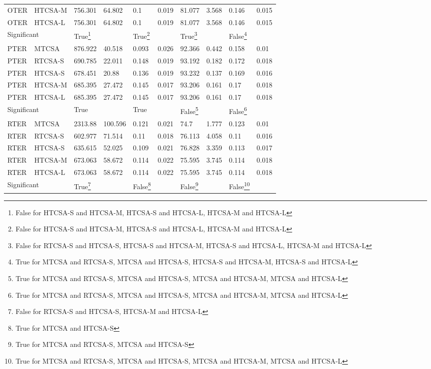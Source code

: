 \begin{table}[H]
\begin{minipage}{\textwidth}
\begin{tabular}{llllllllll}
			OTER & HTCSA-M & 756.301 & 64.802 & 0.1 & 0.019 & 81.077 & 3.568 & 0.146 & 0.015 \\ 
			OTER & HTCSA-L & 756.301 & 64.802 & 0.1 & 0.019 & 81.077 & 3.568 & 0.146 & 0.015 \\ 
			\multicolumn{2}{l}{Significant} & True\footnote{False for HTCSA-S and HTCSA-M, HTCSA-S and HTCSA-L, HTCSA-M and HTCSA-L} &  & True\footnote{False for HTCSA-S and HTCSA-M, HTCSA-S and HTCSA-L, HTCSA-M and HTCSA-L} &  & True\footnote{False for RTCSA-S and HTCSA-S, HTCSA-S and HTCSA-M, HTCSA-S and HTCSA-L, HTCSA-M and HTCSA-L} &  & False\footnote{True for MTCSA and RTCSA-S, MTCSA and HTCSA-S, HTCSA-S and HTCSA-M, HTCSA-S and HTCSA-L} &  \\ 
			\midrule
			PTER & MTCSA & 876.922 & 40.518 & 0.093 & 0.026 & 92.366 & 0.442 & 0.158 & 0.01 \\ 
			PTER & RTCSA-S & 690.785 & 22.011 & 0.148 & 0.019 & 93.192 & 0.182 & 0.172 & 0.018 \\ 
			PTER & HTCSA-S & 678.451 & 20.88 & 0.136 & 0.019 & 93.232 & 0.137 & 0.169 & 0.016 \\ 
			PTER & HTCSA-M & 685.395 & 27.472 & 0.145 & 0.017 & 93.206 & 0.161 & 0.17 & 0.018 \\ 
			PTER & HTCSA-L & 685.395 & 27.472 & 0.145 & 0.017 & 93.206 & 0.161 & 0.17 & 0.018 \\ 
			\multicolumn{2}{l}{Significant} & True &  & True &  & False\footnote{True for MTCSA and RTCSA-S, MTCSA and HTCSA-S, MTCSA and HTCSA-M, MTCSA and HTCSA-L} &  & False\footnote{True for MTCSA and RTCSA-S, MTCSA and HTCSA-S, MTCSA and HTCSA-M, MTCSA and HTCSA-L} &  \\ 
			\midrule
			RTER & MTCSA & 2313.88 & 100.596 & 0.121 & 0.021 & 74.7 & 1.777 & 0.123 & 0.01 \\ 
			RTER & RTCSA-S & 602.977 & 71.514 & 0.11 & 0.018 & 76.113 & 4.058 & 0.11 & 0.016 \\ 
			RTER & HTCSA-S & 635.615 & 52.025 & 0.109 & 0.021 & 76.828 & 3.359 & 0.113 & 0.017 \\ 
			RTER & HTCSA-M & 673.063 & 58.672 & 0.114 & 0.022 & 75.595 & 3.745 & 0.114 & 0.018 \\ 
			RTER & HTCSA-L & 673.063 & 58.672 & 0.114 & 0.022 & 75.595 & 3.745 & 0.114 & 0.018 \\ 
			\multicolumn{2}{l}{Significant} & True\footnote{False for RTCSA-S and HTCSA-S, HTCSA-M and HTCSA-L} &  & False\footnote{True for MTCSA and HTCSA-S} &  & False\footnote{True for MTCSA and RTCSA-S, MTCSA and HTCSA-S} &  & False\footnote{True for MTCSA and RTCSA-S, MTCSA and HTCSA-S, MTCSA and HTCSA-M, MTCSA and HTCSA-L} &  \\ 

\end{tabular}
\end{minipage}
\end{table}
